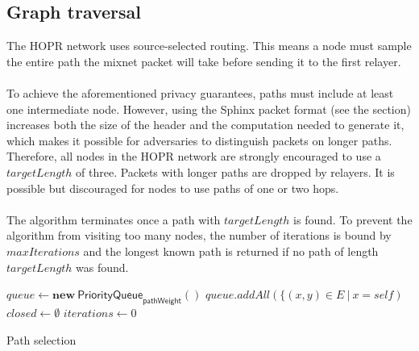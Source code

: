 \subsection{Graph traversal}
\label{sec:path-selection:graph-traversal}

The HOPR network uses source-selected routing. This means a node must sample the entire path the mixnet packet will take before sending it to the first relayer.
\\~\\To achieve the aforementioned privacy guarantees, paths must include at least one intermediate node. However, using the Sphinx packet format (see the  section) increases both the size of the header and the computation needed to generate it, which makes it possible for adversaries to distinguish packets on longer paths. Therefore, all nodes in the HOPR network are strongly encouraged to use a $targetLength$ of three. Packets with longer paths are dropped by relayers. It is possible but discouraged for nodes to use paths of one or two hops.
\\~\\The algorithm terminates once a path with $targetLength$ is found. To prevent the algorithm from visiting too many nodes, the number of iterations is bound by $maxIterations$ and the longest known path is returned if no path of length $targetLength$ was found.

\begin{algorithm}[H]
    \SetAlgoNoLine
    \DontPrintSemicolon
    \;
    $queue \leftarrow \mathbf{new} \ \mathsf{PriorityQueue}_{\textsf{pathWeight}}()$\;
    $queue.addAll(\{ (x,y) \in E \ | \ x = self)$\;
    $closed \leftarrow \emptyset$\;
    $iterations \leftarrow 0$\;
    \;
    \caption{Path selection}
\end{algorithm}
